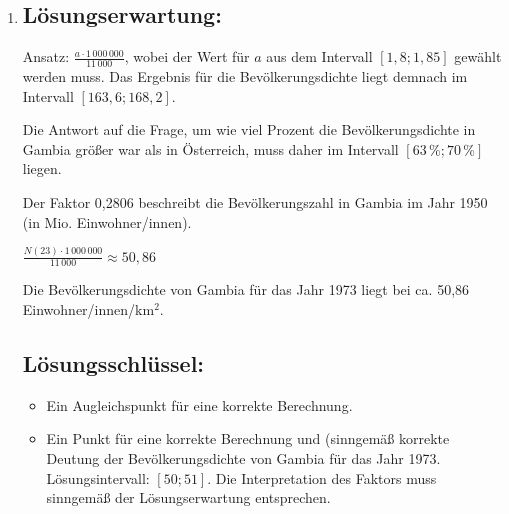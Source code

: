 \begin{langesbeispiel}
{\begin{enumerate}
	\item \subsection{Lösungserwartung:}
		Ansatz: $\frac{a\cdot 1\,000\,000}{11\,000}$, wobei der Wert für $a$ aus dem Intervall $[1,8;1,85]$ gewählt werden muss. Das Ergebnis für die Bevölkerungsdichte liegt demnach im Intervall $[163,6; 168,2]$.
		
		Die Antwort auf die Frage, um wie viel Prozent die Bevölkerungsdichte in Gambia größer war als in Österreich, muss daher im Intervall $[63\,\%; 70\,\%]$ liegen.
		
		Der Faktor 0,2806 beschreibt die Bevölkerungszahl in Gambia im Jahr 1950 (in Mio. Einwohner/innen).
		
		$\frac{N(23)\cdot 1\,000\,000}{11\,000}\approx 50,86$
		
		Die Bevölkerungsdichte von Gambia für das Jahr 1973 liegt bei ca. 50,86 Einwohner/innen/km$^2$.
		
		
	\subsection{Lösungsschlüssel:}
	
\begin{itemize}
	\item Ein Augleichspunkt für eine korrekte Berechnung.
	\item  Ein Punkt für eine korrekte Berechnung und (sinngemäß korrekte Deutung der Bevölkerungsdichte von Gambia für das Jahr 1973. Lösungsintervall: $[50;51]$. Die Interpretation des Faktors muss sinngemäß der Lösungserwartung entsprechen.
\end{itemize}
\end{enumerate}}
		\end{langesbeispiel}
